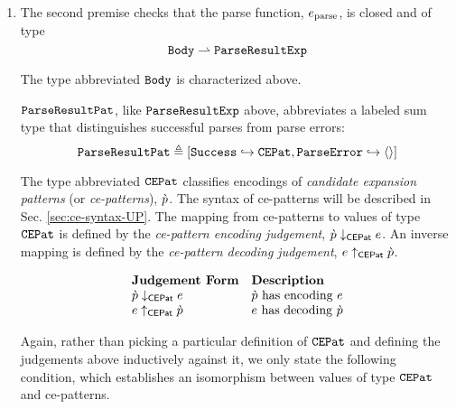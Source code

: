 {{{{\begin{enumerate}
\item The second premise checks that the parse function, $e_\text{parse}$, is closed and of type \[\mathtt{Body} \rightharpoonup \mathtt{ParseResultExp}\] %

The type abbreviated $\mathtt{Body}$ is characterized above.

$\mathtt{ParseResultPat}$, like $\mathtt{ParseResultExp}$ above, abbreviates a labeled sum type that distinguishes successful parses from parse errors:
\[\mathtt{ParseResultPat} \triangleq [\mathtt{Success} \hookrightarrow \mathtt{CEPat}, \mathtt{ParseError} \hookrightarrow \langle  \rangle]\] 

The type abbreviated $\mathtt{CEPat}$ classifies encodings of \emph{candidate expansion patterns} (or \emph{ce-patterns}), $\grave{p}$. The syntax of ce-patterns will be described in Sec. \ref{sec:ce-syntax-UP}. The mapping from ce-patterns to values of type $\mathtt{CEPat}$ is defined by the \emph{ce-pattern encoding judgement}, $\grave{p} \downarrow_\mathsf{CEPat} e$. An inverse mapping is defined by the \emph{ce-pattern decoding judgement}, $e \uparrow_\mathsf{CEPat} \grave{p}$.

\[\begin{array}{ll}
\textbf{Judgement Form} & \textbf{Description}\\
\grave{p} \downarrow_\mathsf{CEPat} e & \text{$\grave{p}$ has encoding $e$}\\
e \uparrow_\mathsf{CEPat} \grave{p} & \text{$e$ has decoding $\grave{p}$}
\end{array}\]

Again, rather than picking a particular definition of $\mathtt{CEPat}$ and defining the judgements above inductively against it, we only state the following condition, which establishes an isomorphism between values of type $\mathtt{CEPat}$ and ce-patterns.


\end{enumerate}}}}}
